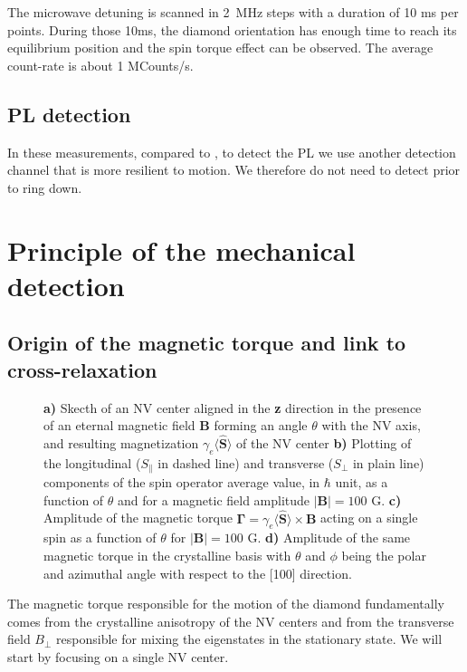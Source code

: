 \documentclass[preprintnumbers,amsmath,amssymb,onecolumn,12pt]{revtex4}
\begin{document}
The microwave detuning is scanned in 2~MHz steps with a duration of 10 ms per points. During those 10ms, the diamond orientation has enough time to reach its equilibrium position and the spin torque effect can be observed. The average count-rate is about 1 MCounts/s. 

\subsection{PL detection}

In these measurements, compared to \cite{DelordNat}, to detect the PL we use another detection channel that is more resilient to motion. We therefore do not need to detect prior to ring down.

\section{Principle of the mechanical detection}

\subsection{Origin of the magnetic torque and link to cross-relaxation}

\begin{figure}[ht]
  \caption{\textbf{a)} Skecth of an NV center aligned in the \textbf{z} direction in the presence of an eternal magnetic field \textbf{B} forming an angle $\theta$ with the NV axis, and resulting magnetization $\gamma_e \langle \mathbf{ \hat S} \rangle$ of the NV center
   \textbf{b)} Plotting of the longitudinal ($S_\parallel$ in dashed line) and transverse ($S_\perp$ in plain line) components of the spin operator average value, in $\hbar$ unit, as a function of $\theta$ and for a magnetic field amplitude $|\mathbf{B}|=100$ G.   
   \textbf{c)} Amplitude of the magnetic torque $\mathbf \Gamma = \gamma_e \langle\hat{\mathbf S}\rangle \times \mathbf B$ acting on a single spin as a function of $\theta$ for $|\mathbf{B}|=100$ G.
   \textbf{d)} Amplitude of the same magnetic torque in the crystalline basis with $\theta$ and $\phi$ being the polar and azimuthal angle with respect to the [100] direction.}
  		\label{Torque1classe}
\end{figure}

The magnetic torque responsible for the motion of the diamond fundamentally comes from the crystalline anisotropy of the NV centers and from the transverse field $B_\perp$ responsible for mixing the eigenstates in the stationary state. We will start by focusing on a single NV center.
\end{document}
